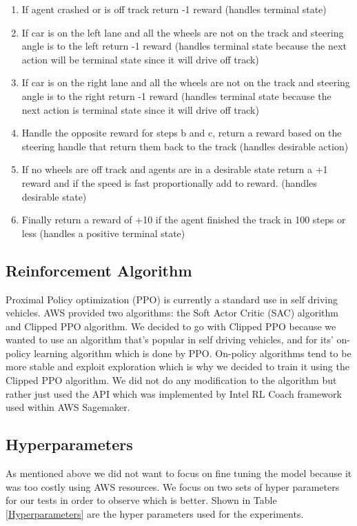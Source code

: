 \documentclass[journal]{IEEEtran}
\begin{document}
\begin{enumerate}
  \item If agent crashed or is off track return -1 reward (handles terminal state)
  \item If car is on the left lane and all the wheels are not on the track and steering angle is to the left return -1 reward (handles terminal state because the next action will be terminal state since it will drive off track)
  \item If car is on the right lane and all the wheels are not on the track and steering angle is to the right return -1 reward (handles terminal state because the next action is terminal state since it will drive off track)
  \item Handle the opposite reward for steps b and c, return a reward based on the steering handle that return them back to the track (handles desirable action)
  \item If no wheels are off track and agents are in a desirable state return a +1 reward and if the speed is fast proportionally add to reward. (handles desirable state)
  \item Finally return  a reward of +10 if the agent finished the track in 100 steps or less (handles a positive terminal state)
\end{enumerate}

\subsection{Reinforcement Algorithm}
Proximal Policy optimization (PPO) is currently a standard use in self driving vehicles.  AWS provided two algorithms: the Soft Actor Critic (SAC) algorithm and Clipped PPO algorithm.  We decided to go with Clipped PPO because we wanted to use an algorithm that's popular in self driving vehicles, and for its' on-policy learning algorithm which is done by PPO.  On-policy algorithms tend to be more stable and exploit exploration which is why we decided to train it using the Clipped PPO algorithm.  We did not do any modification to the algorithm but rather just used the API which was implemented by Intel RL Coach framework used within AWS Sagemaker.

\subsection{Hyperparameters}
As mentioned above we did not want to focus on fine tuning the model because it was too costly using AWS resources. We focus on two sets of hyper parameters for our tests in order to observe which is better.  Shown in Table \ref{Hyperparameters} are the hyper parameters used for the experiments.
\end{document}
